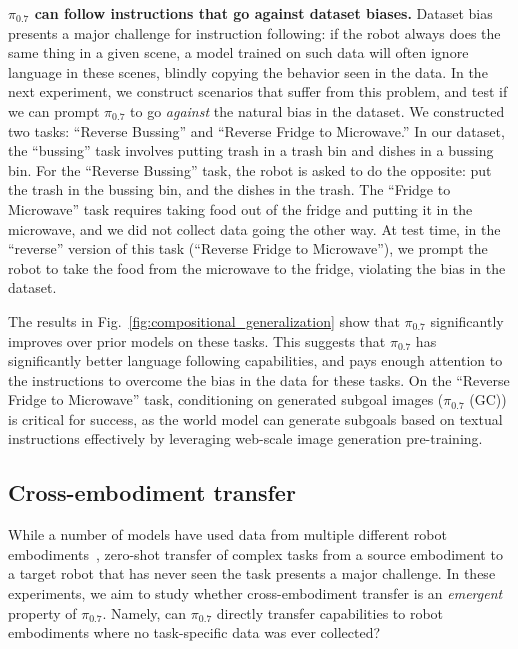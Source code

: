\documentclass[conference]{IEEEtran}
\def \MethodName {$\pi_{0.7}$}
\begin{document}
\noindent \textbf{\MethodName{} can follow instructions that go against dataset biases. }
Dataset bias presents a major challenge for instruction following: if the robot always does the same thing in a given scene, a model trained on such data will often ignore language in these scenes, blindly copying the behavior seen in the data. In the next experiment, we construct scenarios that suffer from this problem, and test if we can prompt \MethodName{} to go \emph{against} the natural bias in the dataset.
We constructed two tasks: ``Reverse Bussing'' and ``Reverse Fridge to Microwave.'' In our dataset, the ``bussing'' task involves putting trash in a trash bin and dishes in a bussing bin. For the ``Reverse Bussing'' task, the robot is asked to do the opposite: put the trash in the bussing bin, and the dishes in the trash. The ``Fridge to Microwave'' task requires taking food out of the fridge and putting it in the microwave, and we did not collect data going the other way. At test time, in the ``reverse'' version of this task (``Reverse Fridge to Microwave''), we prompt the robot to take the food from the microwave to the fridge, violating the bias in the dataset.

The results in Fig.~\ref{fig:compositional_generalization} show that \MethodName{} significantly improves over prior models on these tasks. This suggests that \MethodName{} has significantly better language following capabilities, and pays enough attention to the instructions to overcome the bias in the data for these tasks. On the ``Reverse Fridge to Microwave'' task, conditioning on generated subgoal images (\MethodName{} (GC)) is critical for success, as the world model can generate subgoals based on textual instructions effectively by leveraging web-scale image generation pre-training.


\subsection{Cross-embodiment transfer} \label{sec:cross_emb_transfer}

While a number of models have used data from multiple different robot embodiments~\citep{open_x_embodiment_rt_x_2023,yang2024pushing, team2024octo,wang2024hpt}, zero-shot transfer of complex tasks from a source embodiment to a target robot that has never seen the task presents a major challenge. In these experiments, we aim to study whether cross-embodiment transfer is an \emph{emergent} property of \MethodName{}. Namely, can \MethodName{} directly transfer capabilities to robot embodiments where no task-specific data was ever collected?
\end{document}
